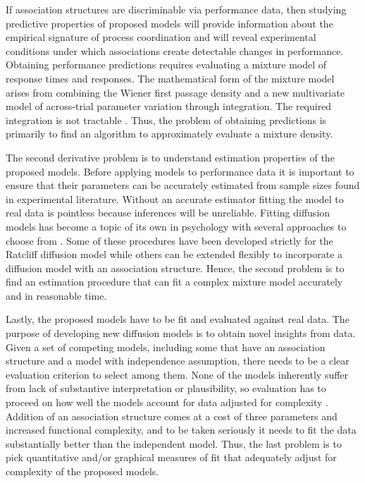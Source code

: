 \documentclass[12pt]{article}
\begin{document}
	If association structures are discriminable via performance data, then studying predictive properties of proposed models will provide information about the empirical signature of process coordination and will reveal experimental conditions under which associations create detectable changes in performance. Obtaining performance predictions requires evaluating a mixture model of response times and responses. The mathematical form of the mixture model arises from combining the Wiener first passage density and a new multivariate model of across-trial parameter variation through integration. The required integration is not tractable \citep{Tue2004}. Thus, the problem of obtaining predictions is primarily to find an algorithm to approximately evaluate a mixture density.
    
	The second derivative problem is to understand estimation properties of the proposed models. Before applying models to performance data it is important to ensure that their parameters can be accurately estimated from sample sizes found in experimental literature. Without an accurate estimator fitting the model to real data is pointless because inferences will be unreliable. Fitting diffusion models has become a topic of its own in psychology with several approaches to choose from \citep{VosVos2007,RatTue2002,VanTue2007,VanTue2011}. Some of these procedures have been developed strictly for the Ratcliff diffusion model while others can be extended flexibly to incorporate a diffusion model with an association structure. Hence, the second problem is to find an estimation procedure that can fit a complex mixture model accurately and in reasonable time.
    
	Lastly, the proposed models have to be fit and evaluated against real data. The purpose of developing new diffusion models is to obtain novel insights from data. Given a set of competing models, including some that have an association structure and a model with independence assumption, there needs to be a clear evaluation criterion to select among them. None of the models inherently suffer from lack of substantive interpretation or plausibility, so evaluation has to proceed on how well the models account for data adjusted for complexity \citep{CavMyu2013}. Addition of an association structure comes at a cost of three parameters and increased functional complexity, and to be taken seriously it needs to fit the data substantially better than the independent model. Thus, the last problem is to pick quantitative and/or graphical measures of fit that adequately adjust for complexity of the proposed models. 
\end{document}
